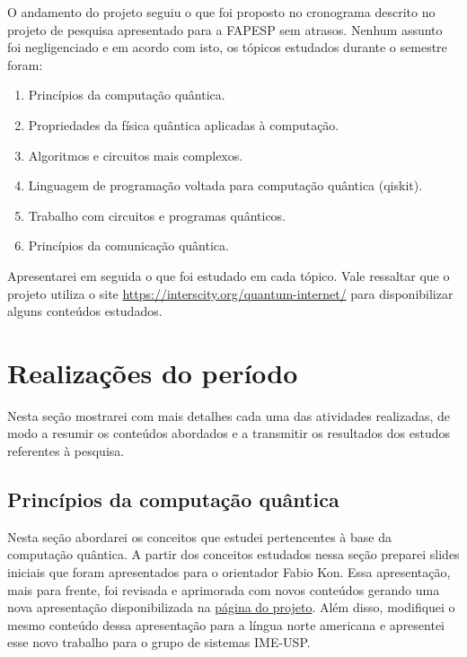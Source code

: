 \documentclass{article}
\begin{document}
     O andamento do projeto seguiu o que foi proposto no cronograma descrito no projeto de pesquisa apresentado para a FAPESP sem atrasos. Nenhum assunto foi negligenciado e em acordo com isto, os tópicos estudados durante o semestre foram:
    \begin{enumerate}
        
        \item Princípios da computação quântica.
        \item Propriedades da física quântica aplicadas à computação.
        \item Algoritmos e circuitos mais complexos.
        \item Linguagem de programação voltada para computação quântica (qiskit).
        \item Trabalho com circuitos e programas quânticos.
        \item Princípios da comunicação quântica.
    \end{enumerate}
    
    Apresentarei em seguida o que foi estudado em cada tópico. Vale ressaltar que o projeto utiliza o site \href{https://interscity.org/quantum-internet/}{https://interscity.org/quantum-internet/} para disponibilizar alguns conteúdos estudados.


\newpage

\section{Realizações do período}
    Nesta seção mostrarei com mais detalhes cada uma das atividades realizadas, de modo a resumir os conteúdos abordados e a transmitir os resultados dos estudos referentes à pesquisa.
    
    \subsection{Princípios da computação quântica}
    Nesta seção abordarei os conceitos que estudei pertencentes à base da computação quântica. A partir dos conceitos estudados nessa seção preparei slides iniciais que foram apresentados para o orientador Fabio Kon. Essa apresentação, mais para frente, foi revisada e aprimorada com novos conteúdos gerando uma nova apresentação disponibilizada na  \href{https://interscity.org/quantum-internet/}{página do projeto}. Além disso, modifiquei o mesmo conteúdo dessa apresentação para a língua norte americana e apresentei esse novo trabalho para o grupo de sistemas IME-USP.
\end{document}
